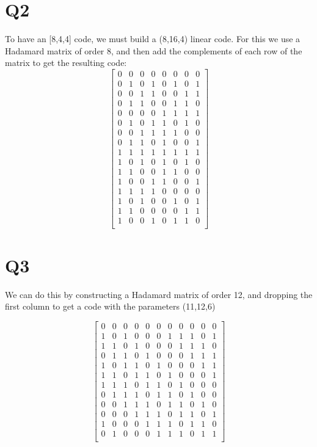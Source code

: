 \documentclass{article}
\begin{document}
\section{Q2}
To have an [8,4,4] code, we must build a (8,16,4) linear code. For this we use a Hadamard matrix of order 8, and then add the complements of each row of the matrix to get the resulting code:
\[
\begin{bmatrix}
0&0&0&0&0&0&0&0\\
0&1&0&1&0&1&0&1\\
0&0&1&1&0&0&1&1\\
0&1&1&0&0&1&1&0\\
0&0&0&0&1&1&1&1\\
0&1&0&1&1&0&1&0\\
0&0&1&1&1&1&0&0\\
0&1&1&0&1&0&0&1\\
1&1&1&1&1&1&1&1\\
1&0&1&0&1&0&1&0\\
1&1&0&0&1&1&0&0\\
1&0&0&1&1&0&0&1\\
1&1&1&1&0&0&0&0\\
1&0&1&0&0&1&0&1\\
1&1&0&0&0&0&1&1\\
1&0&0&1&0&1&1&0\\
\end{bmatrix}
\]

\section{Q3}
We can do this by constructing a Hadamard matrix of order 12, and dropping the first column to get a code with the parameters (11,12,6)

\[
\begin{bmatrix}
0&0&0&0&0&0&0&0&0&0&0\\
1&0&1&0&0&0&1&1&1&0&1\\
1&1&0&1&0&0&0&1&1&1&0\\
0&1&1&0&1&0&0&0&1&1&1\\
1&0&1&1&0&1&0&0&0&1&1\\
1&1&0&1&1&0&1&0&0&0&1\\
1&1&1&0&1&1&0&1&0&0&0\\
0&1&1&1&0&1&1&0&1&0&0\\
0&0&1&1&1&0&1&1&0&1&0\\
0&0&0&1&1&1&0&1&1&0&1\\
1&0&0&0&1&1&1&0&1&1&0\\
0&1&0&0&0&1&1&1&0&1&1\\
\end{bmatrix}
\]
\end{document}
